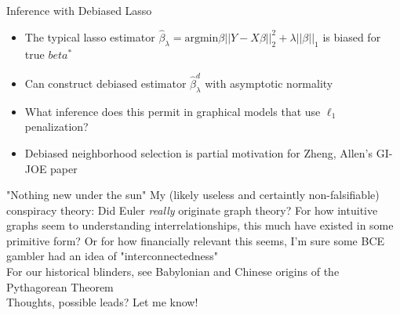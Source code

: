 \documentclass{beamer}
\begin{document}
\begin{frame}{Inference with Debiased Lasso}
    \begin{itemize}
    \item The typical lasso estimator $\hat\beta_\lambda = \text{argmin}\beta ||Y-X\beta||_2^2 + \lambda||\beta||_1$ is biased for true $beta^*$
    \item Can construct debiased estimator $\hat\beta_\lambda^d$ with asymptotic normality 
    \item What inference does this permit in graphical models that use $\ell_1$ penalization? 
    \item Debiased neighborhood selection is partial motivation for Zheng, Allen's GI-JOE paper \cite{zheng_gi-joe_2023}
    \end{itemize}
\end{frame}



\begin{frame}{"Nothing new under the sun"}
    My (likely useless and certaintly non-falsifiable) conspiracy theory: Did Euler {\it really} originate graph theory? For how intuitive graphs seem to understanding interrelationships, this much have existed in some primitive form? Or for how financially relevant this seems, I'm sure some BCE gambler had an idea of "interconnectedness"\newline \\ 
    For our historical blinders, see Babylonian and Chinese origins of the Pythagorean Theorem \newline \\ 
    Thoughts, possible leads? Let me know!
\end{frame}
\end{document}

